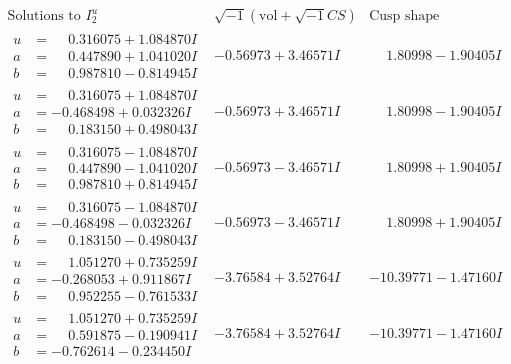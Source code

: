 \documentclass[1p]{elsarticle_modified}
\theoremstyle{definition}
\newcommand{\I}{\sqrt{-1}}
\begin{document}
$$\begin{array}{c|c|c}  
\text{Solutions to }I^u_{2}& \I (\text{vol} + \sqrt{-1}CS) & \text{Cusp shape}\\
 \hline 
\begin{aligned}
u &= \phantom{-}0.316075 + 1.084870 I \\
a &= \phantom{-}0.447890 + 1.041020 I \\
b &= \phantom{-}0.987810 - 0.814945 I\end{aligned}
 & -0.56973 + 3.46571 I & \phantom{-}1.80998 - 1.90405 I \\ \hline\begin{aligned}
u &= \phantom{-}0.316075 + 1.084870 I \\
a &= -0.468498 + 0.032326 I \\
b &= \phantom{-}0.183150 + 0.498043 I\end{aligned}
 & -0.56973 + 3.46571 I & \phantom{-}1.80998 - 1.90405 I \\ \hline\begin{aligned}
u &= \phantom{-}0.316075 - 1.084870 I \\
a &= \phantom{-}0.447890 - 1.041020 I \\
b &= \phantom{-}0.987810 + 0.814945 I\end{aligned}
 & -0.56973 - 3.46571 I & \phantom{-}1.80998 + 1.90405 I \\ \hline\begin{aligned}
u &= \phantom{-}0.316075 - 1.084870 I \\
a &= -0.468498 - 0.032326 I \\
b &= \phantom{-}0.183150 - 0.498043 I\end{aligned}
 & -0.56973 - 3.46571 I & \phantom{-}1.80998 + 1.90405 I \\ \hline\begin{aligned}
u &= \phantom{-}1.051270 + 0.735259 I \\
a &= -0.268053 + 0.911867 I \\
b &= \phantom{-}0.952255 - 0.761533 I\end{aligned}
 & -3.76584 + 3.52764 I & -10.39771 - 1.47160 I \\ \hline\begin{aligned}
u &= \phantom{-}1.051270 + 0.735259 I \\
a &= \phantom{-}0.591875 - 0.190941 I \\
b &= -0.762614 - 0.234450 I\end{aligned}
 & -3.76584 + 3.52764 I & -10.39771 - 1.47160 I \\ \hline\begin{aligned}

\end{aligned}
\end{array}$$
\end{document}
